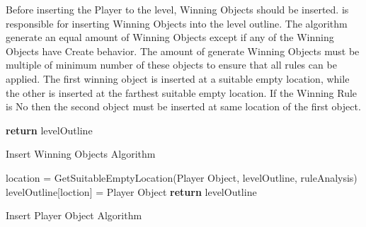 Before inserting the Player to the level, Winning Objects should be inserted.  is responsible for inserting Winning Objects into the level outline. The algorithm generate an equal amount of Winning Objects except if any of the Winning Objects have Create behavior. The amount of generate Winning Objects must be multiple of minimum number of these objects to ensure that all rules can be applied. The first winning object is inserted at a suitable empty location, while the other is inserted at the farthest suitable empty location. If the Winning Rule is No then the second object must be inserted at same location of the first object.\\

\begin{algorithm}[H]
	\BlankLine
	\BlankLine
	\BlankLine
	\textbf{return} levelOutline\;
	\caption{Insert Winning Objects Algorithm}
	\label{Algorithm:winningObjects}
\end{algorithm}

\begin{algorithm}[H]
	\BlankLine
	location = GetSuitableEmptyLocation(Player Object, levelOutline, ruleAnalysis)\;
	levelOutline[loction] = Player Object\;
	\BlankLine
	\textbf{return} levelOutline\;
	\caption{Insert Player Object Algorithm}
	\label{Algorithm:playerObject}
\end{algorithm}

